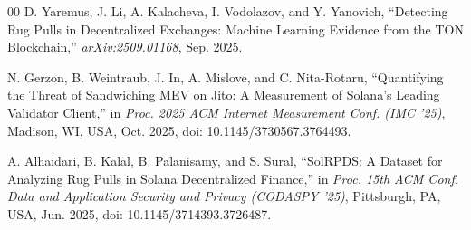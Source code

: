 \documentclass[conference]{IEEEtran}
\begin{document}
\begin{thebibliography}{00}
D. Yaremus, J. Li, A. Kalacheva, I. Vodolazov, and Y. Yanovich, ``Detecting Rug Pulls in Decentralized Exchanges: Machine Learning Evidence from the TON Blockchain,'' \emph{arXiv:2509.01168}, Sep. 2025.

N. Gerzon, B. Weintraub, J. In, A. Mislove, and C. Nita-Rotaru, ``Quantifying the Threat of Sandwiching MEV on Jito: A Measurement of Solana's Leading Validator Client,'' in \emph{Proc. 2025 ACM Internet Measurement Conf. (IMC '25)}, Madison, WI, USA, Oct. 2025, doi: 10.1145/3730567.3764493.

A. Alhaidari, B. Kalal, B. Palanisamy, and S. Sural, ``SolRPDS: A Dataset for Analyzing Rug Pulls in Solana Decentralized Finance,'' in \emph{Proc. 15th ACM Conf. Data and Application Security and Privacy (CODASPY '25)}, Pittsburgh, PA, USA, Jun. 2025, doi: 10.1145/3714393.3726487.

\end{thebibliography}

\balance
\end{document}
